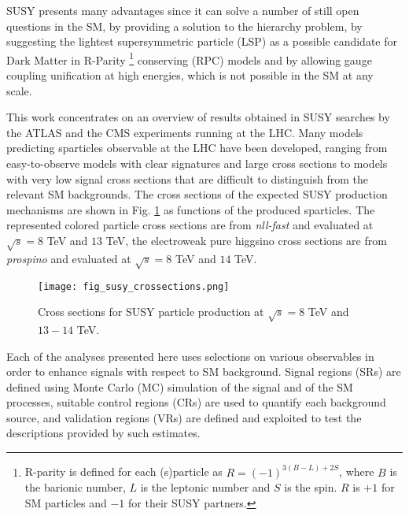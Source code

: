 \documentclass{ws-ijmpcs}
\begin{document}
SUSY presents many advantages since it can solve a number of still open questions in the SM, by providing a solution to the hierarchy problem, by suggesting the lightest supersymmetric particle (LSP) as a possible candidate for Dark Matter in R-Parity \footnote{R-parity is defined for each (s)particle as $R = (-1)^{3(B-L)+2S}$, where $B$ is the barionic number, $L$ is the leptonic number and $S$ is the spin. $R$ is $+1$ for SM particles and $-1$ for their SUSY partners.} conserving (RPC) models and by allowing gauge coupling unification  at high energies, which is not possible in the SM at any scale.

This work concentrates on an overview of results obtained in SUSY searches by the ATLAS \cite{atlasexp} and the CMS \cite{cmsexp} experiments running at the LHC.
Many models predicting sparticles observable at the LHC have been developed, ranging from easy-to-observe models with clear signatures and large cross sections to models with very low signal cross sections that are difficult to distinguish from the relevant SM backgrounds. The cross sections of the expected SUSY production mechanisms are shown in Fig. \ref{crossections} as functions of the produced sparticles. The represented colored particle cross sections are from {\it nll-fast} \cite{Beenakker2011fu} and evaluated at $\sqrt{s} = 8$ TeV and $13$ TeV, the electroweak pure higgsino cross sections are from {\it prospino} \cite{Beenakker1996ed} and evaluated at $\sqrt{s} = 8$ TeV and $14$ TeV.

\begin{figure}[pb]
\hspace{-13mm}
\centerline{\texttt{[image: fig\_susy\_crossections.png]}}
\vspace*{8pt}
\vspace{-26mm}
\caption{Cross sections for SUSY particle production at $\sqrt{s} = 8$ TeV and $13-14$ TeV.\label{crossections}}
\end{figure}

Each of the analyses presented here uses selections on various observables in order to enhance signals with respect to SM background. Signal regions (SRs) are defined using Monte Carlo (MC) simulation of the signal and of the SM processes, suitable control regions (CRs) are used to quantify each background source, and validation regions (VRs) are defined and exploited to test the descriptions provided by such estimates.
\end{document}
